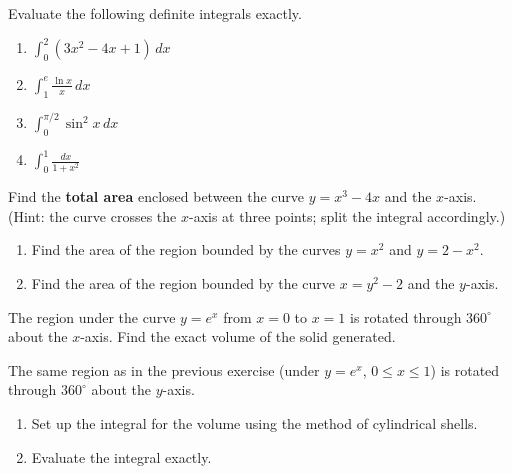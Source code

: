 \documentclass[11pt]{article}
\newcounter{popsec}
\newcounter{popsub}
\newcommand{\courssub}[1]{%
  \stepcounter{popsub}%
  \par\vspace{9pt}\noindent{\popxbold\fontsize{11.5}{13}\selectfont\color{popink}{\color{poporange}\thepopsec.\thepopsub}\hspace{6pt}#1}\par\nopagebreak\vspace{4pt}
}
\begin{document}
\begin{exercice}
Evaluate the following definite integrals exactly.
\begin{enumerate}
\item $\displaystyle\int_0^2 (3x^2 - 4x + 1)\,dx$
\item $\displaystyle\int_1^e \frac{\ln x}{x}\,dx$
\item $\displaystyle\int_0^{\pi/2} \sin^2 x\,dx$
\item $\displaystyle\int_0^1 \frac{dx}{1+x^2}$
\end{enumerate}
\end{exercice}

\courssub{I practise}

\begin{exercice}
Find the \textbf{total area} enclosed between the curve $y = x^3 - 4x$ and the $x$-axis. (Hint: the curve crosses the $x$-axis at three points; split the integral accordingly.)
\end{exercice}

\begin{exercice}
\begin{enumerate}
\item Find the area of the region bounded by the curves $y = x^2$ and $y = 2 - x^2$.
\item Find the area of the region bounded by the curve $x = y^2 - 2$ and the $y$-axis.
\end{enumerate}
\end{exercice}

\begin{exercice}
The region under the curve $y = e^x$ from $x = 0$ to $x = 1$ is rotated through $360^\circ$ about the $x$-axis. Find the exact volume of the solid generated.
\end{exercice}

\begin{exercice}
The same region as in the previous exercise (under $y = e^x$, $0 \le x \le 1$) is rotated through $360^\circ$ about the $y$-axis.
\begin{enumerate}
\item Set up the integral for the volume using the method of cylindrical shells.
\item Evaluate the integral exactly.
\end{enumerate}
\end{exercice}
\end{document}
